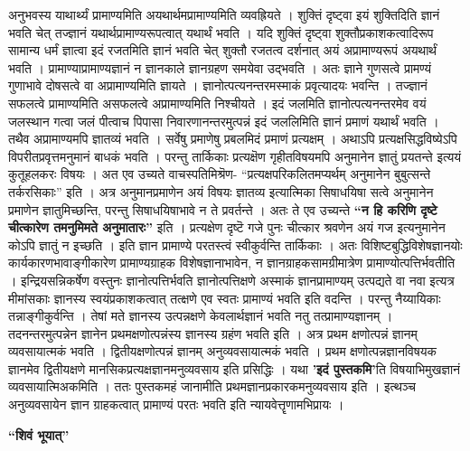 {अनुभवस्य याथार्थ्यं प्रामाण्यमिति अयथार्थमप्रामाण्यमिति व्यवह्रियते । शुक्तिं दृष्ट्वा इयं शुक्तिदिति ज्ञानं भवति चेत् तज्ज्ञानं यथार्थप्रामाण्यरूपत्वात् यथार्थं भवति । यदि शुक्तिं दृष्ट्वा शुक्तौप्रकाशकत्वादिरूप सामान्य धर्मं ज्ञात्वा इदं रजतमिति ज्ञानं भवति चेत् शुक्तौ रजतत्व दर्शनात् अयं अप्रामाण्यरूपं अयथार्थं भवति । प्रामाण्याप्रामाण्यज्ञानं न ज्ञानकाले ज्ञानग्रहण समयेवा उद्भवति । अतः ज्ञाने गुणसत्वे प्रामण्यं गुणाभावे दोषसत्वे वा अप्रामाण्यमिति ज्ञायते । ज्ञानोत्पत्यनन्तरमस्माकं प्रवृत्यादयः भवन्ति । तज्ज्ञानं सफलत्वे प्रामाण्यमिति असफलत्वे अप्रामाण्यमिति निश्चीयते । इदं जलमिति ज्ञानोत्पत्यनन्तरमेव वयं जलस्थान गत्वा जलं पीत्वाच पिपासा निवारणानन्तरमुत्पन्नं इदं जललिमिति ज्ञानं प्रमाणं यथार्थं भवति । तथैव अप्रामाण्यमपि ज्ञातव्यं भवति । सर्वेषु प्रमाणेषु प्रबलमिदं प्रमाणं प्रत्यक्षम् । अथाऽपि प्रत्यक्षसिद्धविष्येऽपि विपरीतप्रवृत्तमनुमानं बाधकं भवति । परन्तु तार्किकाः प्रत्यक्षॆण गृहीतविषयमपि अनुमानेन ज्ञातुं प्रयतन्ते इत्ययं कुतूहलकरः विषयः । अत एव उच्यते वाचस्पतिमिश्रॆण- “प्रत्यक्षपरिकलितमप्यर्थम् अनुमानेन बुबुत्सन्ते तर्करसिकाः” इति । अत्र अनुमानप्रमाणेन अयं विषयः ज्ञातव्य इत्यात्मिका सिषाधयिषा सत्वे अनुमानेन प्रमाणेन ज्ञातुमिच्छन्ति, परन्तु सिषाधयिषाभावे न ते प्रवर्तन्ते । अतः ते एव उच्यन्ते \textbf{“न हि करिणि दृष्टे चीत्कारेण तमनुमिमते अनुमातारः”} इति । प्रत्यक्षेण दृष्टॆ गजे पुनः चीत्कार श्रवणेन अयं गज इत्यनुमानेन कोऽपि ज्ञातुं न इच्छति । इति ज्ञान प्रामाण्ये परतस्त्वं स्वीकुर्वन्ति तार्किकाः । अतः विशिष्टबुद्धिविशेषज्ञानयोः कार्यकारणभावाङ्गीकारेण प्रामाण्यग्राहक विशेषज्ञानाभावेन, न ज्ञानग्राहकसामग्रीमात्रेण प्रामाण्योत्पत्तिर्भवतीति । इन्द्रियसन्निकर्षेण वस्तुनः ज्ञानोत्पत्तिर्भवति ज्ञानोत्पत्तिक्षणे अस्माकं ज्ञानप्रामाण्यम् उत्पद्यते वा नवा इत्यत्र मीमांसकाः ज्ञानस्य स्वयंप्रकाशकत्वात् तत्क्षणे एव स्वतः प्रामाण्यं भवति इति वदन्ति । परन्तु नैय्यायिकाः तन्नाङ्गीकुर्वन्ति । तेषां मते ज्ञानस्य उत्पन्नक्षणे केवलार्थज्ञानं भवति नतु तत्प्रामाण्यज्ञानम् । तदनन्तरमुत्पन्नेन ज्ञानेन प्रथमक्षणोत्पन्नंस्य ज्ञानस्य ग्रहंण भवति इति । अत्र प्रथम क्षणोत्पन्नं ज्ञानम् व्यवसायात्मकं भवति । द्वितीयक्षणोत्पन्नं ज्ञानम् अनुव्यवसायात्मकं भवति । प्रथम क्षणोत्पन्नज्ञानविषयक ज्ञानमेव द्वितीयक्षणे मानसिकप्रत्यक्षज्ञानमनुव्यवसाय इति प्रसिद्धिः । यथा \textbf{’इदं पुस्तकमि’}ति विषयाभिमुखज्ञानं व्यवसायात्मिअकमिति । ततः पुस्तकमहं जानामीति प्रथमज्ञानप्रकारकमनुव्यवसाय इति । इत्थञ्च अनुव्यवसायेन ज्ञान ग्राहकत्वात् प्रामाण्यं परतः भवति इति न्यायवेत्तॄणामभिप्रायः ।

\textbf{“शिवं भूयात्”}

}
